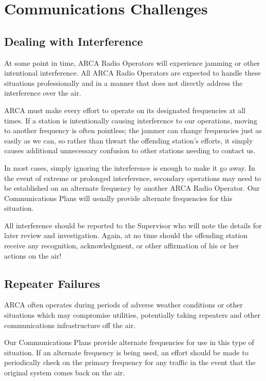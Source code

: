 \documentclass[pdflatex,letterpaper,twoside,12pt]{book}
\begin{document}
\section{Communications Challenges}

\subsection{Dealing with Interference}

At some point in time, ARCA Radio Operators will experience jamming or other intentional interference.  All ARCA Radio Operators are expected to handle these situations professionally and in a manner that does not directly address the interference over the air.

ARCA must make every effort to operate on its designated frequencies at all times.  If a station is intentionally causing interference to our operations, moving to another frequency is often pointless;  the jammer can change frequencies just as easily as we can, so rather than thwart the offending station's efforts, it simply causes additional unnecessary confusion to other stations needing to contact us.

In most cases, simply ignoring the interference is enough to make it go away.  In the event of extreme or prolonged interference, secondary operations may need to be established on an alternate frequency by another ARCA Radio Operator.  Our Communications Plans will usually provide alternate frequencies for this situation.

All interference should be reported to the Supervisor who will note the details for later review and investigation.
Again, at no time should the offending station receive any recognition, acknowledgment, or other affirmation of his or her actions on the air!

\subsection{Repeater Failures}

ARCA often operates during periods of adverse weather conditions or other situations which may compromise utilities, potentially taking repeaters and other communications infrastructure off the air.

Our Communications Plans provide alternate frequencies for use in this type of situation.  If an alternate frequency is being used, an effort should be made to periodically check on the primary frequency for any traffic in the event that the original system comes back on the air.
\end{document}
